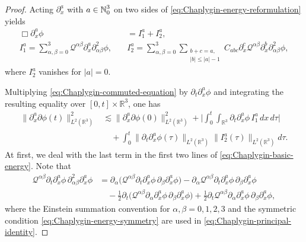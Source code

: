 \documentclass[11pt,twoside]{article}
\def\cQ{\mathcal Q}
\def\N{\mathop{\mathbb N\kern 0pt}\nolimits}
\def\ls{\lesssim}
\theoremstyle{plain}
\theoremstyle{definition}
\theoremstyle{assumption}
\numberwithin{equation}{section}
\begin{document}
	\begin{proof}
		Acting $\partial_x^a$ with $a\in\N_0^3$ on two sides of
		\eqref{eq:Chaplygin-energy-reformulation} yields
		\begin{equation}\label{eq:Chaplygin-commuted-equation}
			\begin{aligned}
				\Box\partial_x^a\phi
				&=
				I_1^a+I_2^a,
				\\
				I_1^a
				=
				\sum_{\alpha,\beta=0}^3
				\cQ^{\alpha\beta}
				\partial_x^a\partial_{\alpha\beta}^2\phi,\quad
				&I_2^a
				=
				\sum_{\alpha,\beta=0}^3
				\sum_{\substack{b+c=a,\\ |b|\le |a|-1}}
				C_{abc}
				\partial_x^c\cQ^{\alpha\beta}
				\partial_x^b\partial_{\alpha\beta}^2\phi,
			\end{aligned}
		\end{equation}
		where $I_2^a$ vanishes for $|a|=0$.
		
		Multiplying \eqref{eq:Chaplygin-commuted-equation} by
		$\partial_t\partial_x^a\phi$ and integrating the resulting equality over
		$[0,t]\times\mathbb R^3$, one has
		\begin{equation}\label{eq:Chaplygin-basic-energy}
			\begin{aligned}
				\|\partial_x^a\partial\phi(t)\|_{L^2(\mathbb R^3)}^2
				&\ls
				\|\partial_x^a\partial\phi(0)\|_{L^2(\mathbb R^3)}^2
				+
				\big|
				\int_0^t\int_{\mathbb R^3}
				\partial_t\partial_x^a\phi\,
				I_1^a\,dx\,d\tau
				\big|
				\\
				&\quad+
				\int_0^t
				\|\partial_t\partial_x^a\phi(\tau)\|_{L^2(\mathbb R^3)}
				\|I_2^a(\tau)\|_{L^2(\mathbb R^3)}
				d\tau.
			\end{aligned}
		\end{equation}
		At first, we deal with the last term in the first two lines of
		\eqref{eq:Chaplygin-basic-energy}. Note that
		\begin{equation}\label{eq:Chaplygin-principal-identity}
			\begin{aligned}
				\cQ^{\alpha\beta}
				\partial_t\partial_x^a\phi\,
				\partial_{\alpha\beta}^2\partial_x^a\phi
				&=
				\partial_\alpha
				\big(
				\cQ^{\alpha\beta}
				\partial_t\partial_x^a\phi\,
				\partial_\beta\partial_x^a\phi
				\big)
				-
				\partial_\alpha\cQ^{\alpha\beta}
				\partial_t\partial_x^a\phi\,
				\partial_\beta\partial_x^a\phi
				\\
				&\quad-
				\frac12\partial_t
				\big(
				\cQ^{\alpha\beta}
				\partial_\alpha\partial_x^a\phi\,
				\partial_\beta\partial_x^a\phi
				\big)
				+
				\frac12\partial_t\cQ^{\alpha\beta}
				\partial_\alpha\partial_x^a\phi\,
				\partial_\beta\partial_x^a\phi,
			\end{aligned}
		\end{equation}
		where the Einstein summation convention for
		$\alpha,\beta=0,1,2,3$ and the symmetric condition
		\eqref{eq:Chaplygin-energy-symmetry} are used in
		\eqref{eq:Chaplygin-principal-identity}.
		

\end{proof}
\end{document}
